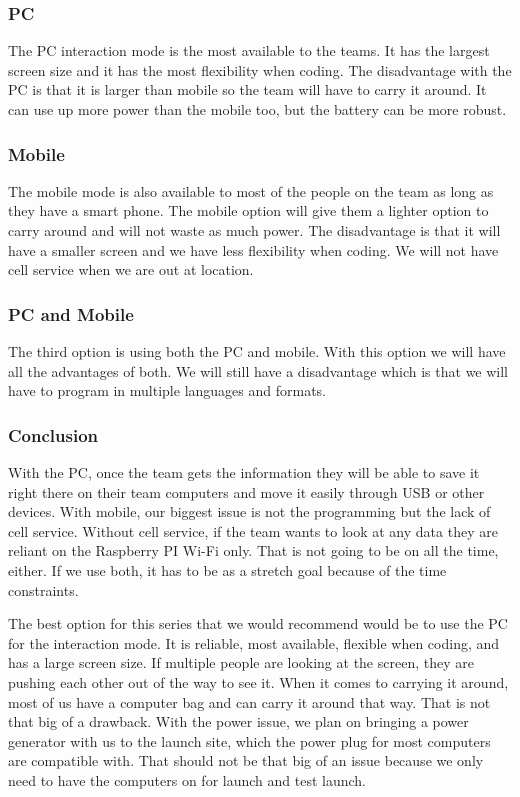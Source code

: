 \documentclass[10pt,draftclsnofoot,onecolumn]{IEEEtran}
\begin{document}
   	\subsubsection{PC}
   	The PC interaction mode is the most available to the teams. It has the largest screen size and it has the most
	flexibility when coding. The disadvantage with the PC is that it is larger than mobile so the team will have to carry it around. 
	It can use up more power than the mobile too, but the battery can be more robust.

   	\subsubsection{Mobile}
   	The mobile mode is also available to most of the people on the team as long as they have a smart phone. 
	The mobile option will give them a lighter option to carry around and will not waste as much power. 
	The disadvantage is that it will have a smaller screen and we have less flexibility when coding.  
	We will not have cell service when we are out at location.

   	\subsubsection{PC and Mobile}
    The third option is using both the PC and mobile. 
	With this option we will have all the advantages of both. 
	We will still have a disadvantage which is that we will have to program in multiple languages and formats. 

   	\subsubsection{Conclusion}
   	With the PC, once the team gets the information they will be able to save it right there on their team computers and move it
	easily through USB or other devices. 
	With mobile, our biggest issue is not the programming but the lack of cell service.
	Without cell service, if the team wants to look at any data they are reliant on the Raspberry PI Wi-Fi only. 
	That is not going to be on all the time, either. 
	If we use both, it has to be as a stretch goal because of the time constraints.  

   	The best option for this series that we would recommend would be to use the PC for the interaction mode. 
	It is reliable, most available, flexible when coding, and has a large screen size. 
	If multiple people are looking at the screen, they are pushing each other out of the way to see it. 
	When it comes to carrying it around, most of us have a computer bag and can carry it around that way. 
	That is not that big of a drawback. 
	With the power issue, we plan on bringing a power generator with us to the launch site, which the power plug for most computers
	are compatible with. 
	That should not be that big of an issue because we only need to have the computers on for launch and test launch.
	
\end{document}
